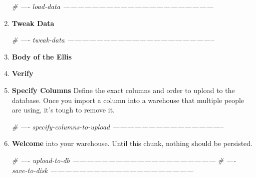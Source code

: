 \documentclass[]{book}
\newenvironment{Shaded}{\begin{snugshade}}{\end{snugshade}}
\newcommand{\CharTok}[1]{\textcolor[rgb]{0.31,0.60,0.02}{#1}}
\newcommand{\CommentTok}[1]{\textcolor[rgb]{0.56,0.35,0.01}{\textit{#1}}}
\newcommand{\DataTypeTok}[1]{\textcolor[rgb]{0.13,0.29,0.53}{#1}}
\newcommand{\KeywordTok}[1]{\textcolor[rgb]{0.13,0.29,0.53}{\textbf{#1}}}
\newcommand{\NormalTok}[1]{#1}
\newcommand{\OperatorTok}[1]{\textcolor[rgb]{0.81,0.36,0.00}{\textbf{#1}}}
\newcommand{\StringTok}[1]{\textcolor[rgb]{0.31,0.60,0.02}{#1}}
\begin{document}
\begin{enumerate}
\begin{Shaded}
\begin{Highlighting}[]
\CommentTok{# ---- load-data ---------------------------------------------------------------}
\end{Highlighting}
\end{Shaded}
\item
  \textbf{Tweak Data}

\begin{Shaded}
\begin{Highlighting}[]
\CommentTok{# ---- tweak-data --------------------------------------------------------------}
\end{Highlighting}
\end{Shaded}
\item
  \textbf{Body of the Ellis}
\item
  \textbf{Verify}

\begin{Shaded}
\end{Shaded}
\item
  \textbf{Specify Columns} Define the exact columns and order to upload to the database. Once you import a column into a warehouse that multiple people are using, it's tough to remove it.

\begin{Shaded}
\begin{Highlighting}[]
\CommentTok{# ---- specify-columns-to-upload -----------------------------------------------}
\end{Highlighting}
\end{Shaded}
\item
  \textbf{Welcome} into your warehouse. Until this chunk, nothing should be persisted.

\begin{Shaded}
\begin{Highlighting}[]
\CommentTok{# ---- upload-to-db ------------------------------------------------------------}
\CommentTok{# ---- save-to-disk ------------------------------------------------------------}
\end{Highlighting}
\end{Shaded}
\end{enumerate}
\end{document}
